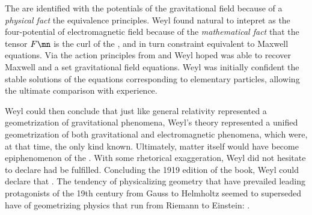 The \gmn are identified with the potentials of the gravitational field because of a \emph{physical fact} the equivalence principles. Weyl found natural to intepret \phin as the four-potential of electromagnetic field  because of the \emph{mathematical fact} that the tensor $F\mn$ is the curl of the \phin, and in turn constraint equivalent to Maxwell equations. Via the action principles from \gmn and \phin Weyl hoped was able to recover Maxwell and a set gravitational field equations. Weyl was initially confident  the stable solutions of the equations corresponding to elementary particles, allowing the ultimate comparison with experience.



Weyl could then conclude that just like general relativity represented a geometrization of gravitational phenomena, Weyl's theory represented a unified geometrization of both gravitational and electromagnetic phenomena, which were, at that time, the only kind known. Ultimately, matter itself would have become epiphenomenon of the . With some rhetorical exaggeration, Weyl did not hesitate to declare  had be fulfilled. Concluding the 1919 edition of the book, Weyl could declare that . The tendency of physicalizing geometry that have prevailed leading protagonists of the 19th century from Gauss to Helmholtz seemed to superseded have of geometrizing physics that run from Riemann to Einstein:  \citep[263]{Weyl1919}. 









